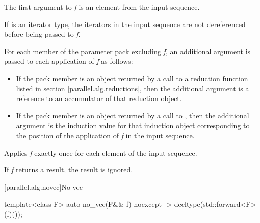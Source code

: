 \begin{itemdescr}
The first argument to {\em f} is an element from the input sequence.\begin{note}If  is an iterator type, the iterators in the input sequence are not dereferenced before being passed to {\em f}.\end{note} For each member of the  parameter pack excluding {\em f}, an additional argument is passed to each application of {\em f} as follows:

\begin{itemize}
\item If the pack member is an object returned by a call to a reduction function listed in section [parallel.alg.reductions], then the additional argument is a reference to an accumulator of that reduction object.

\item If the pack member is an object returned by a call to , then the additional argument is the induction value for that induction object corresponding to the position of the application of {\em f} in the input sequence.
\end{itemize}

\pnum
\complexity Applies {\em f} exactly once for each element of the input sequence.

\pnum
\remarks If {\em f} returns a result, the result is ignored.

\end{itemdescr}

[parallel.alg.novec]{No vec}

\begin{itemdecl}
template<class F>
  auto no_vec(F&& f) noexcept -> decltype(std::forward<F>(f)());
\end{itemdecl}

